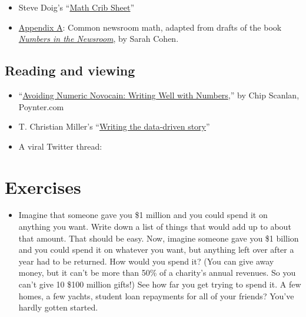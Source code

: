 \documentclass[
  letterpaper,
  DIV=11,
  numbers=noendperiod]{scrreprt}
\providecommand{\tightlist}{%
  \setlength{\itemsep}{0pt}\setlength{\parskip}{0pt}}\usepackage{longtable,booktabs,array}
\begin{document}
\begin{itemize}
\tightlist
\item
  Steve Doig's
  ``\href{https://businessjournalism.org/2017/09/newsroom-math-crib-sheet/}{Math
  Crib Sheet}''
\item
  \protect\hyperlink{appendix-math}{Appendix A}: Common newsroom math,
  adapted from drafts of the book
  \href{https://www.ire.org/product/numbers-in-the-newsroom-using-math-and-statistics-in-news-second-edition-e-version/}{\emph{Numbers
  in the Newsroom}}, by Sarah Cohen.
\end{itemize}

\hypertarget{reading-and-viewing}{%
\subsection*{Reading and viewing}\label{reading-and-viewing}}

\begin{itemize}
\item
  ``\href{https://www.poynter.org/news/avoiding-numeric-novocain-writing-well-numbers}{Avoiding
  Numeric Novocain: Writing Well with Numbers},'' by Chip Scanlan,
  Poynter.com
\item
  T. Christian Miller's
  ``\href{https://cronkitedata.s3.amazonaws.com/docs/data-writing-tmiller.pdf}{Writing
  the data-driven story}''
\item
  A viral Twitter thread:
\end{itemize}

\hypertarget{exercises-1}{%
\section{Exercises}\label{exercises-1}}

\begin{itemize}
\tightlist
\item
  Imagine that someone gave you \$1 million and you could spend it on
  anything you want. Write down a list of things that would add up to
  about that amount. That should be easy. Now, imagine someone gave you
  \$1 billion and you could spend it on whatever you want, but anything
  left over after a year had to be returned. How would you spend it?
  (You can give away money, but it can't be more than 50\% of a
  charity's annual revenues. So you can't give 10 \$100 million gifts!)
  See how far you get trying to spend it. A few homes, a few yachts,
  student loan repayments for all of your friends? You've hardly gotten
  started.
\end{itemize}
\end{document}
